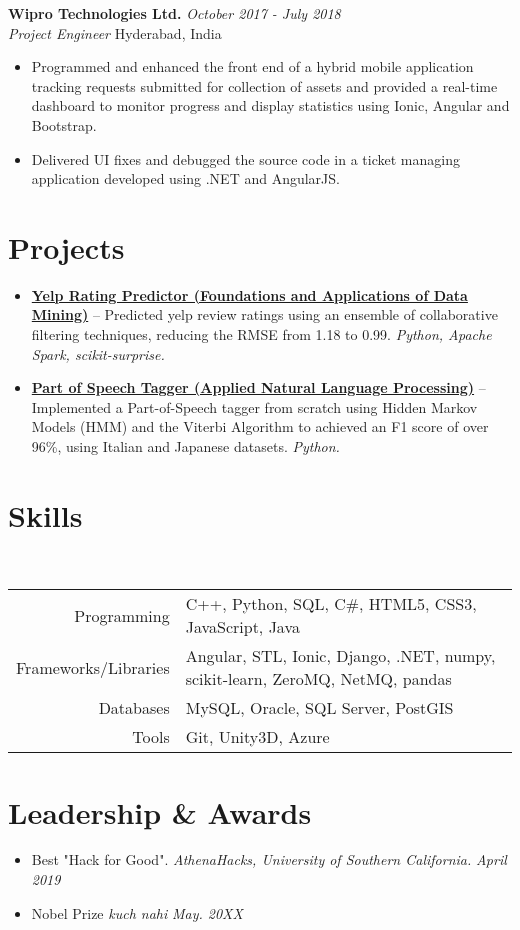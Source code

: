 \documentclass[letterpaper,10pt]{article}
\newcommand{\organization}[4]{
    \vspace{1.5pt}
    \textbf{#1} \hfill{\emph{#2}} \\
    \emph{#3} \hfill{#4} \\
    \vspace{3pt}
}
\newcommand{\pro}[4]{
    \item \href{#2} \textbf{#1} -- {#3} \emph{#4}
}
\newcommand{\skills}[4]{
    \vspace{-2pt}
    \ \ \ \ \ \ \ \ \ \ \ 
    \begin{tabular}{r!{\color{burgundy}\vrule}l}
          Programming & #1 \\
          Frameworks/Libraries & #2 \\
          Databases & #3 \\
          Tools & #4
    \end{tabular}
    \vspace{4pt}
}
\newcommand{\activity}[3]{
    \item #1 \textit{#2} \hfill{\emph{#3}}      
}
\newcommand{\bulletsBegin}{
    \vspace{1pt}
    \begin{minipage}{17.6cm} 
    \begin{itemize}[leftmargin=0.6cm]
    \setlength\itemsep{-0.009em}
}
\newcommand{\bulletsEnd}{
    \end{itemize}\vspace{0pt}
    \end{minipage}
}
\newcommand{\bulletsBeginn}{
    \vspace{1pt}
    \begin{minipage}{18cm} 
    \begin{itemize}[leftmargin=0.6cm]
}
\newcommand{\bulletsEndd}{
    \end{itemize}\vspace{0pt}
    \end{minipage}
}
\begin{document}
        \organization{Wipro Technologies Ltd.}{October 2017 - July 2018}
        {Project Engineer}{Hyderabad, India}
        \bulletsBegin
            \item Programmed and enhanced the front end of a hybrid mobile application tracking requests submitted for collection of assets and provided a real-time dashboard to monitor progress and display statistics using Ionic, Angular and Bootstrap.
            \item Delivered UI fixes and debugged the source code in a ticket managing application developed using .NET and AngularJS.
        \bulletsEnd

    \section{Projects}

    
        \bulletsBegin
            \vspace{-3pt}
        \pro{Yelp Rating Predictor (Foundations and Applications of Data Mining)}
            {https://github.com/example/project}
            {Predicted yelp review ratings using an ensemble of collaborative filtering techniques, reducing the RMSE from 1.18 to 0.99.}
            {Python, Apache Spark, scikit-surprise.}
        \pro{Part of Speech Tagger (Applied Natural Language Processing)}
            {https://github.com/example/project}
            {Implemented a Part-of-Speech tagger from scratch using Hidden Markov Models (HMM) and the Viterbi Algorithm to achieved an F1 score of over 96\%, using Italian and Japanese datasets.}
            {Python.}
        
        \bulletsEnd

    \section{Skills}
    
    \skills
        {C++, Python, SQL, C\#, HTML5, CSS3, JavaScript, Java}  %
        {Angular, STL, Ionic, Django, .NET, numpy, scikit-learn, ZeroMQ, NetMQ, pandas}  %
        {MySQL, Oracle, SQL Server, PostGIS}  %
        {Git, Unity3D, Azure}  %

    
    \section{Leadership \& Awards}

    \bulletsBeginn
        \activity{Best "Hack for Good".}{AthenaHacks, University of Southern California.}{April 2019}
        \vspace{-4pt}
        \activity{Nobel Prize}{kuch nahi}{May. 20XX}
    \bulletsEndd

\end{document}

